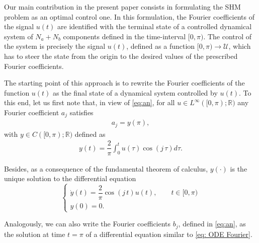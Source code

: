 \documentclass[9pt,shortpaper,twoside,web]{ieeecolor}
\begin{document}
Our main contribution in the present paper consists in formulating the SHM problem as an optimal control one. In this formulation, the Fourier coefficients of the signal $u(t)$ are identified with the terminal state of a controlled dynamical system of $N_a+N_b$ components defined in the time-interval $[0,\pi)$.  The control of the system is precisely the signal $u(t)$, defined as a function $[0,\pi)\to \mathcal{U}$, which has to steer the state from the origin to the desired values of the prescribed Fourier coefficients. 

The starting point of this approach is to rewrite the Fourier coefficients of the function $u(t)$ as the final state of a dynamical system controlled by $u(t)$. To this end, let us first note that, in view of \eqref{eq:an}, for all $u\in L^\infty ([0,\pi);\mathbb{R})$ any Fourier coefficient $a_j$ satisfies
\begin{align*}
	a_j = y(\pi), 
\end{align*}
with $y\in C([0,\pi);\mathbb{R})$ defined as
\begin{align*}
	y(t) = \dfrac{2}{\pi} \int_0^t u(\tau) \cos(j\, \tau) d\tau.
\end{align*}

Besides, as a consequence of the fundamental theorem of calculus, $y(\cdot)$ is the unique solution to the differential equation
\begin{equation}\label{eq: ODE Fourier}
	\begin{cases}
		\dot{y} (t) = \dfrac{2}{\pi} \cos(j\, t) u(t), \qquad  t\in [0,\pi)
		\\[5pt]
		y(0) = 0.
	\end{cases}
\end{equation}

Analogously, we can also write the Fourier coefficients $b_j$, defined in \eqref{eq:an}, as the solution at time $t=\pi$ of a differential equation similar to \eqref{eq: ODE Fourier}.
\end{document}
